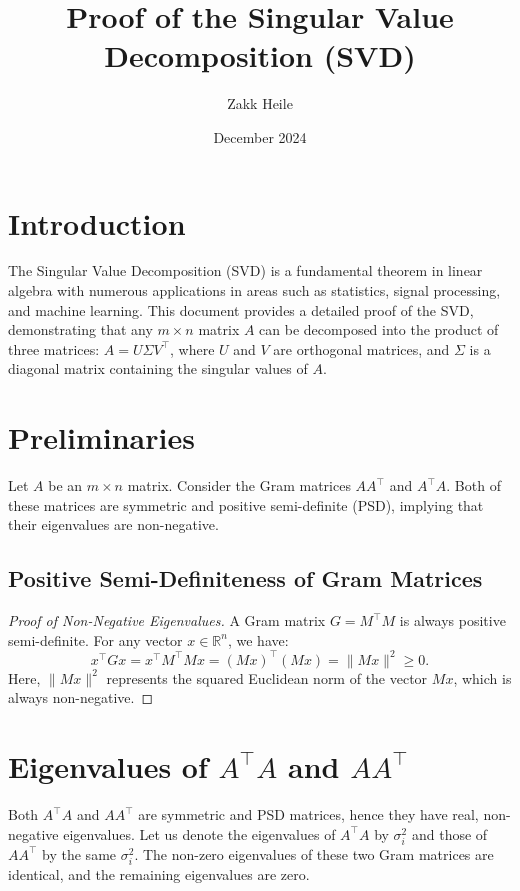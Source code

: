 \documentclass{article}
\title{Proof of the Singular Value Decomposition (SVD)}
\author{Zakk Heile}
\date{December 2024}
\begin{document}
\maketitle

\section{Introduction}

The Singular Value Decomposition (SVD) is a fundamental theorem in linear algebra with numerous applications in areas such as statistics, signal processing, and machine learning. This document provides a detailed proof of the SVD, demonstrating that any \( m \times n \) matrix \( A \) can be decomposed into the product of three matrices: \( A = U \Sigma V^\top \), where \( U \) and \( V \) are orthogonal matrices, and \( \Sigma \) is a diagonal matrix containing the singular values of \( A \).

\section{Preliminaries}

Let \( A \) be an \( m \times n \) matrix. Consider the Gram matrices \( A A^\top \) and \( A^\top A \). Both of these matrices are symmetric and positive semi-definite (PSD), implying that their eigenvalues are non-negative. 

\subsection{Positive Semi-Definiteness of Gram Matrices}

\begin{proof}[Proof of Non-Negative Eigenvalues]
A Gram matrix \( G = M^\top M \) is always positive semi-definite. For any vector \( x \in \mathbb{R}^n \), we have:
\[
x^\top G x = x^\top M^\top M x = \left( M x \right)^\top \left( M x \right) = \| M x \|^2 \geq 0.
\]
Here, \( \| M x \|^2 \) represents the squared Euclidean norm of the vector \( M x \), which is always non-negative.
\end{proof}

\section{Eigenvalues of \( A^\top A \) and \( A A^\top \)}

Both \( A^\top A \) and \( A A^\top \) are symmetric and PSD matrices, hence they have real, non-negative eigenvalues. Let us denote the eigenvalues of \( A^\top A \) by \( \sigma_i^2 \) and those of \( A A^\top \) by the same \( \sigma_i^2 \). The non-zero eigenvalues of these two Gram matrices are identical, and the remaining eigenvalues are zero.
\end{document}
